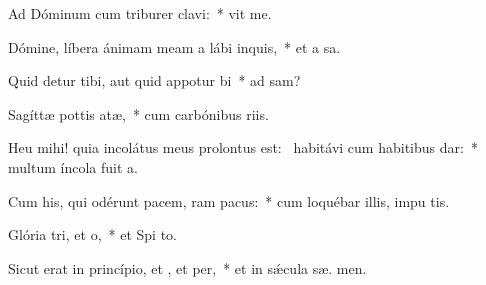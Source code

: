 \item Ad Dóminum cum triburer clavi:~*  vit me.
\item Dómine, líbera ánimam meam a lábi inquis,~* et a  sa.
\item Quid detur tibi, aut quid appotur bi~* ad  sam?
\item Sagíttæ pottis atæ,~* cum carbónibus riis.
\item Heu mihi! quia incolátus meus prolontus est:~\pscross{} habitávi cum habitibus dar:~* multum íncola fuit  a.
\item Cum his, qui odérunt pacem, ram pacus:~* cum loquébar illis, impu  tis.
\item Glória tri, et o,~* et Spi to.
\item Sicut erat in princípio, et , et per,~* et in sǽcula sæ. men.
